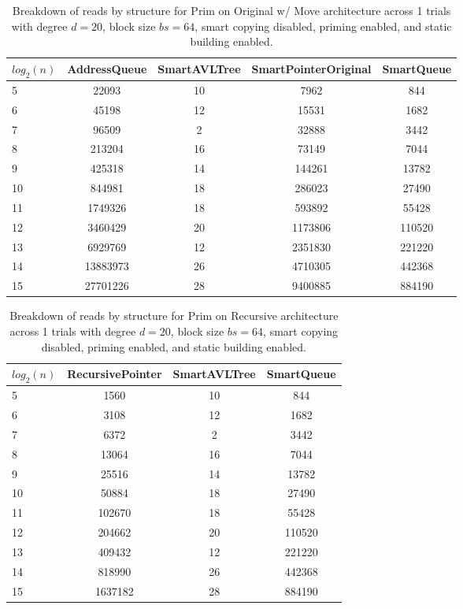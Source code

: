 \begin{table}[]
\centering
\begin{tabular}{|l|c|c|c|c|}
$log_2(n)$ & AddressQueue & SmartAVLTree & SmartPointerOriginal & SmartQueue \\ \hline
5 & 22093 & 10 & 7962 & 844 \\ \hline
6 & 45198 & 12 & 15531 & 1682 \\ \hline
7 & 96509 & 2 & 32888 & 3442 \\ \hline
8 & 213204 & 16 & 73149 & 7044 \\ \hline
9 & 425318 & 14 & 144261 & 13782 \\ \hline
10 & 844981 & 18 & 286023 & 27490 \\ \hline
11 & 1749326 & 18 & 593892 & 55428 \\ \hline
12 & 3460429 & 20 & 1173806 & 110520 \\ \hline
13 & 6929769 & 12 & 2351830 & 221220 \\ \hline
14 & 13883973 & 26 & 4710305 & 442368 \\ \hline
15 & 27701226 & 28 & 9400885 & 884190 \\ \hline
\end{tabular}
\caption{Breakdown of reads by structure for Prim on Original w/ Move architecture across 1 trials with degree $d=20$, block size $bs=64$, smart copying disabled, priming enabled, and static building enabled.}
    \label{tab:reads_by_structure_prim_d20_bs64_trials1_copiesfalse_primetrue_staticinsertiontrue_ptoriginal_movetrue}
\end{table}

\begin{table}[]
\centering
\begin{tabular}{|l|c|c|c|}
$log_2(n)$ & RecursivePointer & SmartAVLTree & SmartQueue \\ \hline
5 & 1560 & 10 & 844 \\ \hline
6 & 3108 & 12 & 1682 \\ \hline
7 & 6372 & 2 & 3442 \\ \hline
8 & 13064 & 16 & 7044 \\ \hline
9 & 25516 & 14 & 13782 \\ \hline
10 & 50884 & 18 & 27490 \\ \hline
11 & 102670 & 18 & 55428 \\ \hline
12 & 204662 & 20 & 110520 \\ \hline
13 & 409432 & 12 & 221220 \\ \hline
14 & 818990 & 26 & 442368 \\ \hline
15 & 1637182 & 28 & 884190 \\ \hline
\end{tabular}
\caption{Breakdown of reads by structure for Prim on Recursive architecture across 1 trials with degree $d=20$, block size $bs=64$, smart copying disabled, priming enabled, and static building enabled.}
    \label{tab:reads_by_structure_prim_d20_bs64_trials1_copiesfalse_primetrue_staticinsertiontrue_ptrecursive_movetrue}
\end{table}

